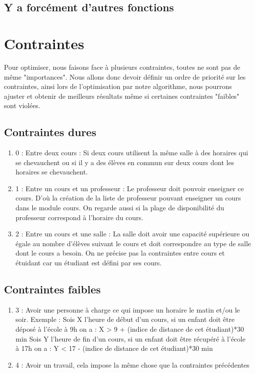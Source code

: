\documentclass[a4paper,11pt]{article}
\begin{document}
	\subsection{Y a forcément d'autres fonctions}

\section{Contraintes}
	Pour optimiser, nous faisons face à plusieurs contraintes, toutes ne sont pas 
	de même "importances". Nous allons donc devoir définir un ordre de priorité sur 
	les contraintes, ainsi lors de l'optimisation par notre algorithme, nous 
	pourrons ajuster et obtenir de meilleurs résultats même si certaines contraintes
	"faibles" sont violées.\\
	\subsection{Contraintes dures}
		\begin{enumerate}
			\item 0 : Entre deux cours : Si deux cours utilisent la même salle à des horaires qui se chevauchent ou
			si il y a des élèves en commun sur deux cours dont les horaires se chevauchent.
			\item 1 : Entre un cours et un professeur : Le professeur doit pouvoir enseigner ce cours. D'où la création de la liste de professeur pouvant enseigner un cours dans le module cours.
			On regarde aussi si la plage de disponibilité du professeur correspond à l'horaire du cours.
			\item 2 : Entre un cours et une salle : La salle doit avoir une capacité supérieure ou égale au nombre d'élèves suivant le cours et doit correspondre au type de salle dont le cours a besoin.
			On ne précise pas la contraintes entre cours et étuidant car un étudiant est défini par ses cours.
		\end{enumerate}
	\subsection{Contraintes faibles}
		\begin{enumerate}
			\item 3 : Avoir une personne à charge ce qui impose un horaire le matin et/ou le soir.
			Exemple : Sois X l'heure de début d'un cours, si un enfant doit être déposé à l'école à 9h on a : X > 9 + (indice de distance de cet étudiant)*30 min
			Sois Y l'heure de fin d'un cours, si un enfant doit être récupéré à l'école à 17h on a : Y < 17 - (indice de distance de cet étudiant)*30 min
			\item 4 : Avoir un travail, cela impose la même chose que la contraintes précédentes
		\end{enumerate}
\end{document}
